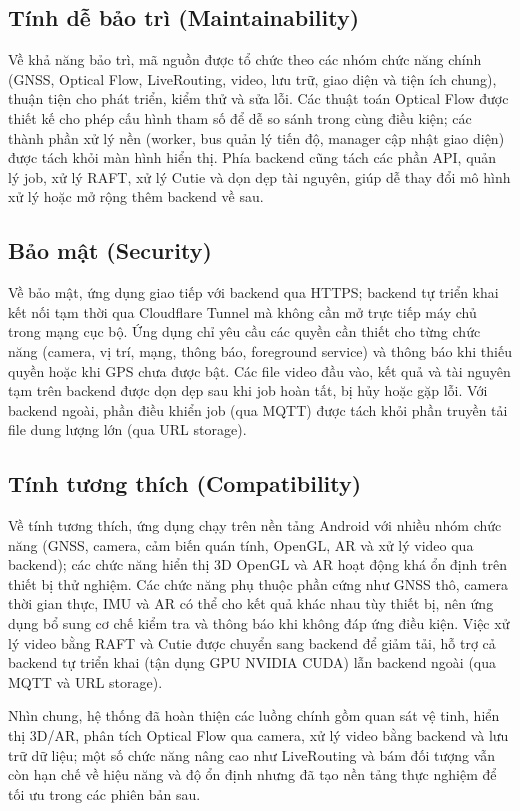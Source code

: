 \documentclass[../DoAn.tex]{subfiles}
\begin{document}
\subsection{Tính dễ bảo trì (Maintainability)}
\label{subsection:2.4.4}
Về khả năng bảo trì, mã nguồn được tổ chức theo các nhóm chức năng chính (GNSS, Optical Flow, LiveRouting, video, lưu trữ, giao diện và tiện ích chung), thuận tiện cho phát triển, kiểm thử và sửa lỗi. Các thuật toán Optical Flow được thiết kế cho phép cấu hình tham số để dễ so sánh trong cùng điều kiện; các thành phần xử lý nền (worker, bus quản lý tiến độ, manager cập nhật giao diện) được tách khỏi màn hình hiển thị. Phía backend cũng tách các phần API, quản lý job, xử lý RAFT, xử lý Cutie và dọn dẹp tài nguyên, giúp dễ thay đổi mô hình xử lý hoặc mở rộng thêm backend về sau.

\subsection{Bảo mật (Security)}
\label{subsection:2.4.5}
Về bảo mật, ứng dụng giao tiếp với backend qua HTTPS; backend tự triển khai kết nối tạm thời qua Cloudflare Tunnel mà không cần mở trực tiếp máy chủ trong mạng cục bộ. Ứng dụng chỉ yêu cầu các quyền cần thiết cho từng chức năng (camera, vị trí, mạng, thông báo, foreground service) và thông báo khi thiếu quyền hoặc khi GPS chưa được bật. Các file video đầu vào, kết quả và tài nguyên tạm trên backend được dọn dẹp sau khi job hoàn tất, bị hủy hoặc gặp lỗi. Với backend ngoài, phần điều khiển job (qua MQTT) được tách khỏi phần truyền tải file dung lượng lớn (qua URL storage).

\subsection{Tính tương thích (Compatibility)}
\label{subsection:2.4.6}
Về tính tương thích, ứng dụng chạy trên nền tảng Android với nhiều nhóm chức năng (GNSS, camera, cảm biến quán tính, OpenGL, AR và xử lý video qua backend); các chức năng hiển thị 3D OpenGL và AR hoạt động khá ổn định trên thiết bị thử nghiệm. Các chức năng phụ thuộc phần cứng như GNSS thô, camera thời gian thực, IMU và AR có thể cho kết quả khác nhau tùy thiết bị, nên ứng dụng bổ sung cơ chế kiểm tra và thông báo khi không đáp ứng điều kiện. Việc xử lý video bằng RAFT và Cutie được chuyển sang backend để giảm tải, hỗ trợ cả backend tự triển khai (tận dụng GPU NVIDIA CUDA) lẫn backend ngoài (qua MQTT và URL storage).

Nhìn chung, hệ thống đã hoàn thiện các luồng chính gồm quan sát vệ tinh, hiển thị 3D/AR, phân tích Optical Flow qua camera, xử lý video bằng backend và lưu trữ dữ liệu; một số chức năng nâng cao như LiveRouting và bám đối tượng vẫn còn hạn chế về hiệu năng và độ ổn định nhưng đã tạo nền tảng thực nghiệm để tối ưu trong các phiên bản sau.
\end{document}
